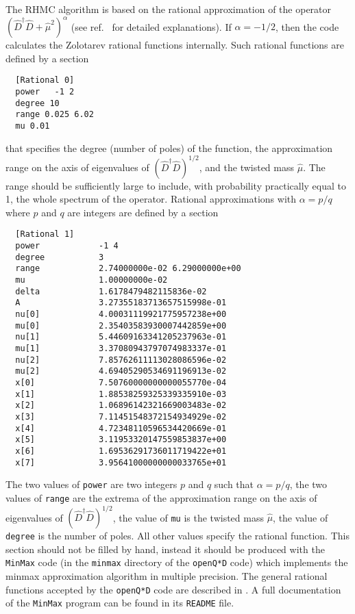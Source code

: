 \documentclass[11pt,fleqn]{article}
\begin{document}
The RHMC algorithm is based on the rational approximation of the operator
$(\hat{D}^\dag \hat{D} + \hat{\mu}^2)^\alpha$ (see ref.~\cite{rhmc} for detailed
explanations). If $\alpha=-1/2$, then the code calculates the Zolotarev rational
functions internally. Such rational functions are defined by a section
%
\begin{verbatim}
  [Rational 0]
  power   -1 2
  degree 10
  range 0.025 6.02
  mu 0.01
\end{verbatim}
%
that specifies the degree (number of poles) of the function, the approximation
range on the axis of eigenvalues of $(\hat{D}^\dag \hat{D})^{1/2}$, and the
twisted mass $\hat{\mu}$. The range should be sufficiently large to include,
with probability practically equal to 1, the whole spectrum of the operator.
Rational approximations with $\alpha = p/q$ where $p$ and $q$ are integers are
defined by a section
%
\begin{verbatim}
  [Rational 1]
  power            -1 4
  degree           3
  range            2.74000000e-02 6.29000000e+00
  mu               1.00000000e-02
  delta            1.6178479482115836e-02
  A                3.27355183713657515998e-01
  nu[0]            4.00031119921775957238e+00
  mu[0]            2.35403583930007442859e+00
  nu[1]            5.44609163341205237963e-01
  mu[1]            3.37080943797074983337e-01
  nu[2]            7.85762611113028086596e-02
  mu[2]            4.69405290534691196913e-02
  x[0]             7.50760000000000055770e-04
  x[1]             1.88538259325339335910e-03
  x[2]             1.06896142321669003483e-02
  x[3]             7.11451548372154934929e-02
  x[4]             4.72348110596534420669e-01
  x[5]             3.11953320147559853837e+00
  x[6]             1.69536291736011719422e+01
  x[7]             3.95641000000000033765e+01
\end{verbatim}
%
The two values of \texttt{power} are two integers $p$ and $q$ such that $\alpha
= p/q$, the two values of \texttt{range} are the extrema of the approximation
range on the axis of eigenvalues of $(\hat{D}^\dag \hat{D})^{1/2}$, the value of
\texttt{mu} is the twisted mass $\hat{\mu}$, the value of \texttt{degree} is the
number of poles. All other values specify the rational function. This section
should not be filled by hand, instead it should be produced with the
\texttt{MinMax} code (in the \texttt{minmax} directory of the \texttt{openQ*D}
code) which implements the minmax approximation algorithm in multiple precision.
The general rational functions accepted by the \texttt{openQ*D} code are
described in \cite{rhmc}. A full documentation of the \texttt{MinMax} program
can be found in its \texttt{README} file.
\end{document}
